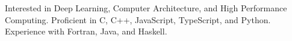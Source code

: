 \begin{cvparagraph}
Interested in Deep Learning, Computer Architecture, and High Performance Computing. Proficient in C, C++, JavaScript, TypeScript, and Python. Experience with Fortran, Java, and Haskell.
\end{cvparagraph}
